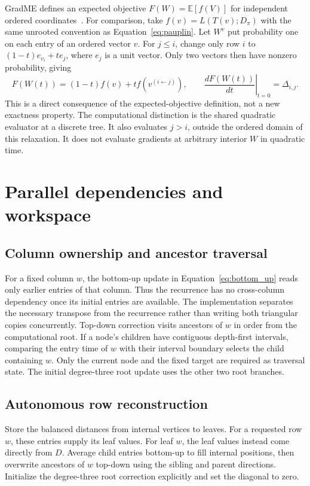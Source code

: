 GradME defines an expected objective $F(W)=\mathbb E[f(V)]$ for independent ordered coordinates~\cite{penn2023gradme}.
For comparison, take $f(v)=L(T(v);D_\pi)$ with the same unrooted convention as Equation~\eqref{eq:pauplin}.
Let $W^v$ put probability one on each entry of an ordered vector $v$.
For $j\leq i$, change only row $i$ to $(1-t)e_{v_i}+t e_j$, where $e_j$ is a unit vector.
Only two vectors then have nonzero probability, giving
\begin{equation}
 F(W(t))=(1-t)f(v)+t f(v^{(i\leftarrow j)}),\qquad
 \left.\frac{dF(W(t))}{dt}\right|_{t=0}=\Delta_{i,j}.
 \label{eq:vertex_gradient}
\end{equation}
This is a direct consequence of the expected-objective definition, not a new exactness property.
The computational distinction is the shared quadratic evaluator at a discrete tree.
It also evaluates $j>i$, outside the ordered domain of this relaxation.
It does not evaluate gradients at arbitrary interior $W$ in quadratic time.

\section{Parallel dependencies and workspace}
\label{sec:parallel_details}

\subsection{Column ownership and ancestor traversal}

For a fixed column $w$, the bottom-up update in Equation~\eqref{eq:bottom_up} reads only earlier entries of that column.
Thus the recurrence has no cross-column dependency once its initial entries are available.
The implementation separates the necessary transpose from the recurrence rather than writing both triangular copies concurrently.
Top-down correction visits ancestors of $w$ in order from the computational root.
If a node's children have contiguous depth-first intervals, comparing the entry time of $w$ with their interval boundary selects the child containing $w$.
Only the current node and the fixed target are required as traversal state.
The initial degree-three root update uses the other two root branches.

\subsection{Autonomous row reconstruction}

Store the balanced distances from internal vertices to leaves.
For a requested row $w$, these entries supply its leaf values.
For leaf $w$, the leaf values instead come directly from $D$.
Average child entries bottom-up to fill internal positions, then overwrite ancestors of $w$ top-down using the sibling and parent directions.
Initialize the degree-three root correction explicitly and set the diagonal to zero.

